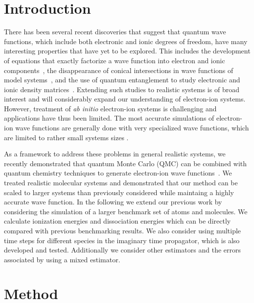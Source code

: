 \documentclass[pra,superscriptaddress,groupedaddress,twocolumn]{revtex4}
\begin{document}
\section{Introduction}
There has been several recent discoveries that suggest that quantum wave functions, which include both electronic and ionic degrees of freedom, have many interesting properties that have yet to be explored.  This includes the development of equations that exactly factorize a wave function into electron and ionic components~\cite{cederbaum1}, the disappearance of conical intersections in wave functions of model systems~\cite{gross2014}, and the use of quantum entanglement to study electronic and ionic density matrices~\cite{boent}.  Extending such studies to realistic systems is of broad interest and will considerably expand our understanding of electron-ion systems.   However, treatment of \textit{ab initio} electron-ion systems is challenging and applications have thus been limited.   The most accurate simulations of electron-ion wave functions are generally done with very specialized wave functions, which are limited to rather small systems sizes \cite{mitroy2013}.  

As a framework to address these problems in general realistic systems, we recently demonstrated that quantum Monte Carlo (QMC) can be combined with quantum chemistry techniques to generate electron-ion wave functions~\cite{Tubman_ECG}.  We treated realistic molecular systems and demonstrated that our method can be scaled to larger systems than previously considered while maintaing a highly accurate wave function.  In the following we extend our previous work by considering the simulation of a larger benchmark set of atoms and molecules.  We calculate ionization energies and dissociation energies which can be directly compared with previous benchmarking results.  We also consider using multiple time steps for different species in the imaginary time propagator, which is also developed and tested.  Additionally we consider other estimators and the errors associated by using a mixed estimator.

\section{Method}
\end{document}
